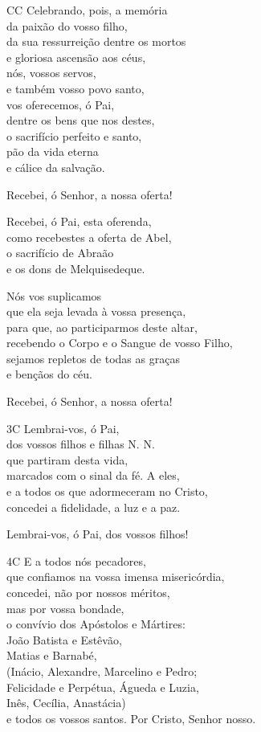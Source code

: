 \documentclass{book}
\begin{document}
\begin{flushleft}
    CC Celebrando, pois, a memória \\
    da paixão do vosso filho, \\
    da sua ressurreição dentre os mortos \\
    e gloriosa ascensão aos céus, \\
    nós, vossos servos, \\
    e também vosso povo santo, \\
    vos oferecemos, ó Pai, \\
    dentre os bens que nos destes, \\
    o sacrifício perfeito e santo, \\
    pão da vida eterna \\
    e cálice da salvação.

    Recebei, ó Senhor, a nossa oferta!

    Recebei, ó Pai, esta oferenda, \\
    como recebestes a oferta de Abel, \\
    o sacrifício de Abraão \\
    e os dons de Melquisedeque.

    Nós vos suplicamos \\
    que ela seja levada à vossa presença, \\
    para que, ao participarmos deste altar, \\
    recebendo o Corpo e o Sangue de vosso Filho, \\
    sejamos repletos de todas as graças \\
    e bençãos do céu.

    Recebei, ó Senhor, a nossa oferta!

    3C Lembrai-vos, ó Pai, \\
    dos vossos filhos e filhas N. N. \\
    que partiram desta vida, \\
    marcados com o sinal da fé.
    A eles, \\
    e a todos os que adormeceram no Cristo, \\
    concedei a fidelidade, a luz e a paz.

    Lembrai-vos, ó Pai, dos vossos filhos!

    4C E a todos nós pecadores, \\
    que confiamos na vossa imensa misericórdia, \\
    concedei, não por nossos méritos, \\
    mas por vossa bondade, \\
    o convívio dos Apóstolos e Mártires: \\
    João Batista e Estêvão, \\
    Matias e Barnabé, \\
    (Inácio, Alexandre, Marcelino e Pedro; \\
    Felicidade e Perpétua, Águeda e Luzia, \\
    Inês, Cecília, Anastácia) \\
    e todos os vossos santos.
    Por Cristo, Senhor nosso.


\end{flushleft}
\end{document}
